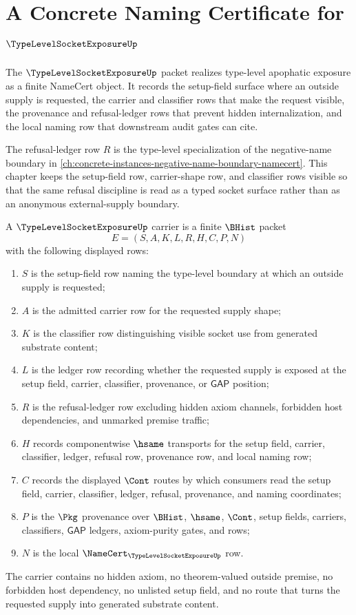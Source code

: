 \chapter{A Concrete Naming Certificate for $\TypeLevelSocketExposureUp$}
\label{ch:concrete-instances-typelevelsocketexposure-namecert}

The $\TypeLevelSocketExposureUp$ packet realizes type-level apophatic exposure as a finite NameCert object. It records the setup-field surface where an outside supply is requested, the carrier and classifier rows that make the request visible, the provenance and refusal-ledger rows that prevent hidden internalization, and the local naming row that downstream audit gates can cite.

The refusal-ledger row $R$ is the type-level specialization of the negative-name boundary in \autoref{ch:concrete-instances-negative-name-boundary-namecert}. This chapter keeps the setup-field row, carrier-shape row, and classifier rows visible so that the same refusal discipline is read as a typed socket surface rather than as an anonymous external-supply boundary.

\begin{definition}
\label{def:type-level-socket-exposure-carrier}
A $\TypeLevelSocketExposureUp$ carrier is a finite $\BHist$ packet
$$
E=(S,A,K,L,R,H,C,P,N)
$$
with the following displayed rows:
\begin{enumerate}
\item $S$ is the setup-field row naming the type-level boundary at which an outside supply is requested;
\item $A$ is the admitted carrier row for the requested supply shape;
\item $K$ is the classifier row distinguishing visible socket use from generated substrate content;
\item $L$ is the ledger row recording whether the requested supply is exposed at the setup field, carrier, classifier, provenance, or $\mathsf{GAP}$ position;
\item $R$ is the refusal-ledger row excluding hidden axiom channels, forbidden host dependencies, and unmarked premise traffic;
\item $H$ records componentwise $\hsame$ transports for the setup field, carrier, classifier, ledger, refusal row, provenance row, and local naming row;
\item $C$ records the displayed $\Cont$ routes by which consumers read the setup field, carrier, classifier, ledger, refusal, provenance, and naming coordinates;
\item $P$ is the $\Pkg$ provenance over $\BHist$, $\hsame$, $\Cont$, setup fields, carriers, classifiers, $\mathsf{GAP}$ ledgers, axiom-purity gates, and \NameCert{} rows;
\item $N$ is the local $\NameCert_{\TypeLevelSocketExposureUp}$ row.
\end{enumerate}
The carrier contains no hidden axiom, no theorem-valued outside premise, no forbidden host dependency, no unlisted setup field, and no route that turns the requested supply into generated substrate content.
\end{definition}

